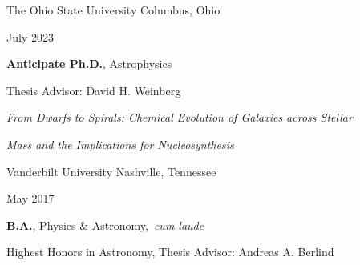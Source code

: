 \documentclass[cv.tex]{subfiles}
\begin{document}
{\color{themecolor}\large The Ohio State University}
\hfill
Columbus, Ohio
\par\noindent
\parbox{0.18\textwidth}{%
	\raggedleft
	July 2023 \par
	\null \par
	\null \par
	\null
}
\hspace{1mm}
\parbox{0.8\textwidth}{%
	\textbf{Anticipate Ph.D.}, Astrophysics
	\par
	Thesis Advisor: David H. Weinberg
	\par
	\textit{From Dwarfs to Spirals: Chemical Evolution of Galaxies across
	Stellar} \par
	\textit{Mass and the Implications for Nucleosynthesis} \par
}
\vspace{2mm}
\par\noindent
{\color{themecolor}\large Vanderbilt University}
\hfill
Nashville, Tennessee
\par\noindent
\parbox{0.18\textwidth}{%
	\raggedleft
	May 2017 \par
	\null
}
\hspace{1mm}
\parbox{0.8\textwidth}{%
	\vspace{1mm}
	\textbf{B.A.}, Physics \& Astronomy,~\textit{cum laude} \par
	Highest Honors in Astronomy, Thesis Advisor: Andreas A. Berlind
}
\end{document}
